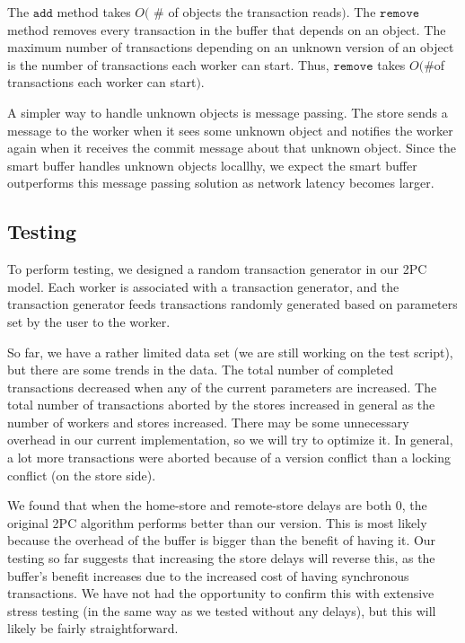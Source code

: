 \documentclass{article}
\begin{document}
The $\mathtt{add}$ method takes $O($ \# of objects the transaction reads$)$. The
$\mathtt{remove}$ method removes every transaction in the buffer that depends on
an object. The maximum number of transactions depending on an unknown version of
an object is the number of transactions each worker can start. Thus,
$\mathtt{remove}$ takes $O($\#of transactions each worker can start$)$.

A simpler way to handle unknown objects is message passing. The store sends a
message to the worker when it sees some unknown object and notifies the worker
again when it receives the commit message about that unknown object. Since the
smart buffer handles unknown objects locallhy, we expect the smart buffer
outperforms this message passing solution as network latency becomes larger.

\subsection{Testing}
To perform testing, we designed a random transaction generator in our 2PC model.
Each worker is associated with a transaction generator, and the transaction
generator feeds transactions randomly generated based on parameters set by the
user to the worker.

So far, we have a rather limited data set (we are still working on the test
script), but there are some trends in the data. The total number of completed
transactions decreased when any of the current parameters are increased. The
total number of transactions aborted by the stores increased in general as the
number of workers and stores increased. There may be some unnecessary overhead
in our current implementation, so we will try to optimize it. In general, a lot
more transactions were aborted because of a version conflict than a locking
conflict (on the store side).

We found that when the home-store and remote-store delays are both 0, the
original 2PC algorithm performs better than our version. This is most likely
because the overhead of the buffer is bigger than the benefit of having it. Our
testing so far suggests that increasing the store delays will reverse this, as
the buffer's benefit increases due to the increased cost of having synchronous
transactions. We have not had the opportunity to confirm this with extensive
stress testing (in the same way as we tested without any delays), but this will
likely be fairly straightforward.
\end{document}
